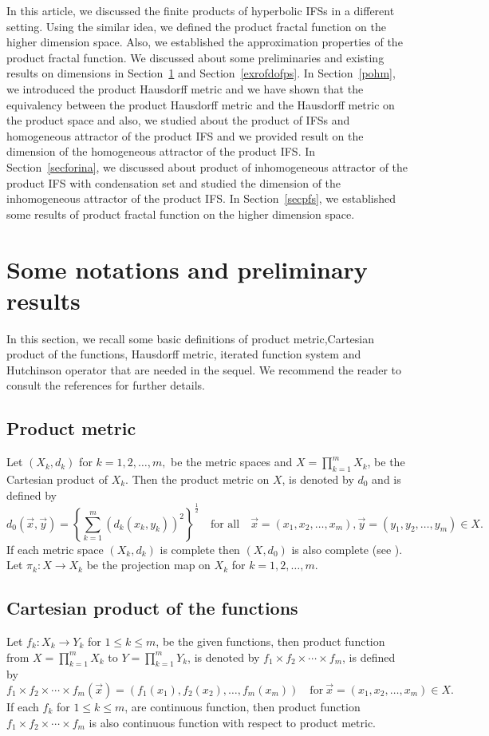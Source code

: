 \documentclass[10pt]{amsart}
\theoremstyle{definition}
\newcommand{\myproduct}[2]{#1=\prod_{k=1}^m#2}
\newcommand{\myseries}[3]{#1\leq #2\leq #3}
\newcommand{\myvec}[3]{#1=(#2_1,#2_2,\ldots,#2_#3)}
\newcommand{\profunc}[1]{#1_1\times#1_2\times\cdots\times#1_m}
\begin{document}
	In this article, we discussed the finite products of hyperbolic IFSs in a different setting. Using the similar idea, we defined the product fractal function on the higher dimension space. Also, we established the approximation properties of the product fractal function.  We discussed about some preliminaries and existing results on dimensions in Section~\ref{preli} and Section~\ref{exrofdofps}. In Section~\ref{pohm}, we introduced the product Hausdorff metric and we  have shown that the equivalency between the product Hausdorff metric and the Hausdorff metric on the product space and also, we studied about the product of IFSs and homogeneous attractor of the product IFS and we provided result on the dimension of the homogeneous attractor of the product IFS. In Section~\ref{secforina}, we discussed about  product of inhomogeneous attractor  of the product IFS with condensation set and studied the dimension of the inhomogeneous attractor of the product IFS. In Section~\ref{secpfs}, we established some results of product fractal function on the higher dimension space. 
	
	\section{Some notations and preliminary results}
	\label{preli}
	In this section, we recall some basic definitions of product metric,Cartesian product of the functions, Hausdorff metric, iterated function system and Hutchinson operator that are needed in the sequel. We recommend the reader to consult the references \cite{TMS, Topo, FG, FE} for further details.
	\subsection{Product metric}
	Let $(X_k,d_k)$ for $k=1,2,\ldots,m,$  be the metric spaces and $X=\prod_{k=1}^{m}X_k$, be the Cartesian product of $X_k$. Then the product metric on $X$, is denoted by $d_0$ and is defined by
	$$d_0(\vec{x},\vec{y})=\left\{\sum_{k=1}^{m}(d_k(x_k,y_k))^2\right \}^{\frac{1}{2}} \quad  \mbox{for all} \quad \vec{x}=(x_1,x_2,\ldots,x_m),\vec{y}=(y_1,y_2,\ldots,y_m)\in X.$$
	If each metric space $(X_k,d_k)$ is complete then $(X,d_0)$ is also complete (see \cite{IFAA}). Let $\pi_k:X\rightarrow X_k$ be the projection map on $X_k$ for $k=1,2,\ldots,m$.
	\subsection{Cartesian product of the functions} Let $f_k:X_k\rightarrow Y_k$ for $\myseries{1}{k}{m}$, be the given functions, then product function from $\myproduct{X}{X_k}$ to $\myproduct{Y}{Y_k}$, is denoted by $\profunc{f}$, is defined by  $$\profunc{f}(\vec{x})=(f_1(x_1),f_2(x_2),\ldots,f_m(x_m))\quad\mbox{for}~\myvec{\vec{x}}{x}{m}\in X.$$
	If each $f_k$ for $\myseries{1}{k}{m}$, are continuous function, then product function $\profunc{f}$ is also continuous function with respect to product metric.
\end{document}
